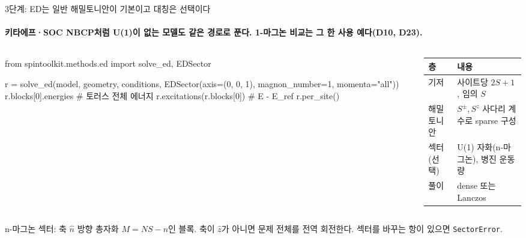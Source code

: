 \begin{frame}[fragile,label=stage3-ed-design]{3단계: ED는 일반 해밀토니안이 기본이고 대칭은 선택이다}
  \framesubtitle{키타에프·SOC NBCP처럼 U(1)이 없는 모델도 같은 경로로 푼다. 1-마그논 비교는 그 한 사용 예다(D10, D23).}
  \begin{columns}[T,onlytextwidth]
    \begin{column}{0.52\textwidth}
\begin{semiverbatim}\scriptsize
from spintoolkit.methods.ed import solve_ed, EDSector

r = solve_ed(model, geometry, conditions,
             EDSector(axis=(0, 0, 1),
                      magnon_number=1,
                      momenta="all"))
r.blocks[0].energies     # 토러스 전체 에너지
r.excitations(r.blocks[0])  # E - E_ref
r.per_site()
\end{semiverbatim}
    \end{column}
    \begin{column}{0.45\textwidth}
      \small
      \begin{tabular}{@{}P{1.5cm}P{3.6cm}@{}}
        \toprule
        층 & 내용 \\
        \midrule
        기저 & 사이트당 $2S+1$, 임의 $S$ \\
        해밀토니안 & $S^\pm,S^z$ 사다리 계수로 sparse 구성 \\
        섹터(선택) & U(1) 자화(n-마그논), 병진 운동량 \\
        풀이 & dense 또는 Lanczos \\
        \bottomrule
      \end{tabular}
    \end{column}
  \end{columns}
  \par\medskip
  \small n-마그논 섹터: 축 $\hat n$ 방향 총자화 $M=NS-n$인 블록. 축이 $\hat z$가 아니면 문제 전체를 전역 회전한다. 섹터를 바꾸는 항이 있으면 \texttt{SectorError}.
  \par\medskip
\end{frame}

